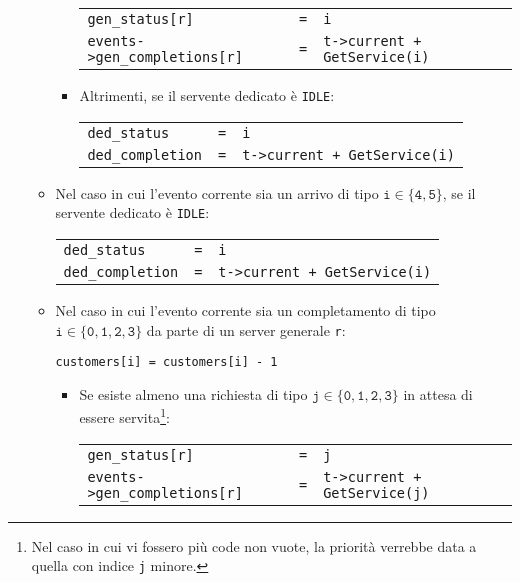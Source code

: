 \begin{enumerate}[label=Step \arabic*), align=left, leftmargin=*]
\begin{itemize}
\begin{itemize}
\begin{center}
\begin{tabular}{l l l}
\texttt{gen\_status[r]} & \texttt{=} & \texttt{i} \\
\texttt{events->gen\_completions[r]} & \texttt{=} & \texttt{t->current + GetService(i)}
\end{tabular}
\end{center}
\item Altrimenti, se il servente dedicato è \texttt{IDLE}:
\begin{center}
\begin{tabular}{l l l}
\texttt{ded\_status} & \texttt{=} & \texttt{i} \\
\texttt{ded\_completion} & \texttt{=} & \texttt{t->current + GetService(i)}
\end{tabular}
\end{center}
\end{itemize}
\item Nel caso in cui l'evento corrente sia un arrivo di tipo $\mathtt{i \in \lbrace 4, 5 \rbrace}$, se il servente dedicato è \texttt{IDLE}:
\begin{center}
\begin{tabular}{l l l}
\texttt{ded\_status} & \texttt{=} & \texttt{i} \\
\texttt{ded\_completion} & \texttt{=} & \texttt{t->current + GetService(i)}
\end{tabular}
\end{center}
\item Nel caso in cui l'evento corrente sia un completamento di tipo $\mathtt{i \in \lbrace 0, 1, 2, 3 \rbrace}$ da parte di un server generale \texttt{r}:
\begin{center}
\texttt{customers[i] = customers[i] - 1}
\end{center}
\begin{itemize}
\item Se esiste almeno una richiesta di tipo $\mathtt{j \in \lbrace 0, 1, 2, 3 \rbrace}$ in attesa di essere servita\footnote{\label{note:modello-computazionale-1}Nel caso in cui vi fossero più code non vuote, la priorità verrebbe data a quella con indice \texttt{j} minore.}:
\begin{center}
\begin{tabular}{l l l}
\texttt{gen\_status[r]} & \texttt{=} & \texttt{j} \\
\texttt{events->gen\_completions[r]} & \texttt{=} & \texttt{t->current + GetService(j)}
\end{tabular}
\end{center}

\end{itemize}
\end{itemize}
\end{enumerate}
